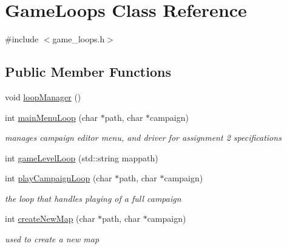 \hypertarget{class_game_loops}{}\section{Game\+Loops Class Reference}
\label{class_game_loops}


{\ttfamily \#include $<$game\+\_\+loops.\+h$>$}

\subsection*{Public Member Functions}
\begin{DoxyCompactItemize}
\item 
void \hyperlink{class_game_loops_a8aa13702c60f9e77a7dea9f698556ec0}{loop\+Manager} ()
\item 
\hypertarget{class_game_loops_a0d2d3b5ba10bfa266fe069a2ab8655b1}{}\label{class_game_loops_a0d2d3b5ba10bfa266fe069a2ab8655b1} 
int \hyperlink{class_game_loops_a0d2d3b5ba10bfa266fe069a2ab8655b1}{main\+Menu\+Loop} (char $\ast$path, char $\ast$campaign)
\begin{DoxyCompactList}\small\item\em manages campaign editor menu, and driver for assignment 2 specifications \end{DoxyCompactList}\item 
int \hyperlink{class_game_loops_aeeda849e01acbbd017f46a4d9f69a9d7}{game\+Level\+Loop} (std\+::string mappath)
\item 
\hypertarget{class_game_loops_af661ca7d40601d62795023a2a15c132e}{}\label{class_game_loops_af661ca7d40601d62795023a2a15c132e} 
int \hyperlink{class_game_loops_af661ca7d40601d62795023a2a15c132e}{play\+Campaign\+Loop} (char $\ast$path, char $\ast$campaign)
\begin{DoxyCompactList}\small\item\em the loop that handles playing of a full campaign \end{DoxyCompactList}\item 
\hypertarget{class_game_loops_affbae87d486a36d5ad2a34a8a5f14c32}{}\label{class_game_loops_affbae87d486a36d5ad2a34a8a5f14c32} 
int \hyperlink{class_game_loops_affbae87d486a36d5ad2a34a8a5f14c32}{create\+New\+Map} (char $\ast$path, char $\ast$campaign)
\begin{DoxyCompactList}\small\item\em used to create a new map \end{DoxyCompactList}\item 

\end{DoxyCompactItemize}
